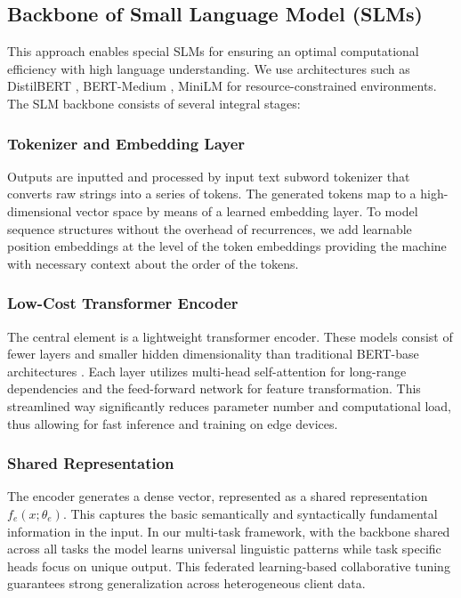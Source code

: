 \subsection{Backbone of Small Language Model (SLMs)} This approach enables special SLMs for ensuring an optimal computational efficiency with high language understanding. We use architectures such as DistilBERT \cite{sanh2019distilbert}, BERT-Medium \cite{turc2019well}, MiniLM \cite{wang2020minilm} for resource-constrained environments. The SLM backbone consists of several integral stages:

\subsubsection{Tokenizer and Embedding Layer} Outputs are inputted and processed by input text subword tokenizer that converts raw strings into a series of tokens. The generated tokens map to a high-dimensional vector space by means of a learned embedding layer. To model sequence structures without the overhead of recurrences, we add learnable position embeddings at the level of the token embeddings providing the machine with necessary context about the order of the tokens.

\subsubsection{Low-Cost Transformer Encoder} The central element is a lightweight transformer encoder. These models consist of fewer layers and smaller hidden dimensionality than traditional BERT-base architectures \cite{devlin2019bert}. Each layer utilizes multi-head self-attention for long-range dependencies and the feed-forward network for feature transformation. This streamlined way significantly reduces parameter number and computational load, thus allowing for fast inference and training on edge devices.

\subsubsection{Shared Representation} The encoder generates a dense vector, represented as a shared representation $f_e(x; \theta_e)$. This captures the basic semantically and syntactically fundamental information in the input. In our multi-task framework, with the backbone shared across all tasks the model learns universal linguistic patterns while task specific heads focus on unique output. This federated learning-based collaborative tuning guarantees strong generalization across heterogeneous client data.

